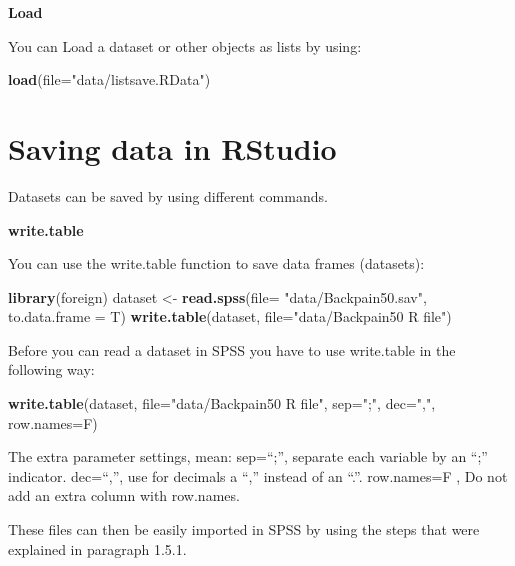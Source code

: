 \documentclass[
]{book}
\newenvironment{Shaded}{\begin{snugshade}}{\end{snugshade}}
\newcommand{\DataTypeTok}[1]{\textcolor[rgb]{0.13,0.29,0.53}{#1}}
\newcommand{\KeywordTok}[1]{\textcolor[rgb]{0.13,0.29,0.53}{\textbf{#1}}}
\newcommand{\NormalTok}[1]{#1}
\newcommand{\StringTok}[1]{\textcolor[rgb]{0.31,0.60,0.02}{#1}}
\begin{document}
\textbf{Load}

You can Load a dataset or other objects as lists by using:

\begin{Shaded}
\begin{Highlighting}[]
\KeywordTok{load}\NormalTok{(}\DataTypeTok{file=}\StringTok{"data/listsave.RData"}\NormalTok{)}
\end{Highlighting}
\end{Shaded}

\hypertarget{saving-data-in-rstudio}{%
\section{Saving data in RStudio}\label{saving-data-in-rstudio}}

Datasets can be saved by using different commands.

\textbf{write.table}

You can use the write.table function to save data frames (datasets):

\begin{Shaded}
\begin{Highlighting}[]
\KeywordTok{library}\NormalTok{(foreign)}
\NormalTok{dataset <-}\StringTok{ }\KeywordTok{read.spss}\NormalTok{(}\DataTypeTok{file=} \StringTok{"data/Backpain50.sav"}\NormalTok{, }\DataTypeTok{to.data.frame =}\NormalTok{ T)}
\KeywordTok{write.table}\NormalTok{(dataset, }\DataTypeTok{file=}\StringTok{"data/Backpain50 R file"}\NormalTok{)}
\end{Highlighting}
\end{Shaded}

Before you can read a dataset in SPSS you have to use write.table in the
following way:

\begin{Shaded}
\begin{Highlighting}[]
\KeywordTok{write.table}\NormalTok{(dataset, }\DataTypeTok{file=}\StringTok{"data/Backpain50 R file"}\NormalTok{, }\DataTypeTok{sep=}\StringTok{";"}\NormalTok{, }\DataTypeTok{dec=}\StringTok{","}\NormalTok{, }\DataTypeTok{row.names=}\NormalTok{F)}
\end{Highlighting}
\end{Shaded}

The extra parameter settings, mean: sep=``;'', separate each variable by
an ``;'' indicator. dec=``,'', use for decimals a ``,'' instead of an
``.''. row.names=F , Do not add an extra column with row.names.

These files can then be easily imported in SPSS by using the steps that
were explained in paragraph 1.5.1.
\end{document}
